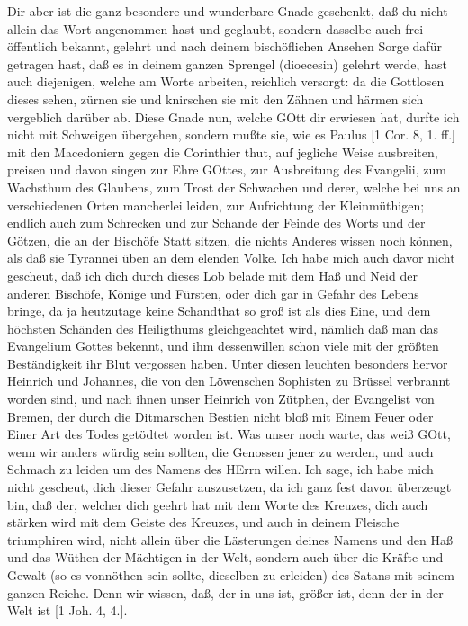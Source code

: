 Dir aber ist die ganz besondere und wunderbare Gnade geschenkt, daß du nicht allein das Wort angenommen hast und geglaubt, sondern dasselbe auch frei öffentlich bekannt, gelehrt und nach deinem bischöflichen Ansehen Sorge dafür getragen hast, daß es in deinem ganzen Sprengel (dioecesin) gelehrt werde, hast auch diejenigen, welche am Worte arbeiten, reichlich versorgt: da die Gottlosen dieses sehen, zürnen sie und knirschen sie mit den Zähnen und härmen sich vergeblich darüber ab. Diese Gnade nun, welche GOtt dir erwiesen hat, durfte ich nicht mit Schweigen übergehen, sondern mußte sie, wie es Paulus [1 Cor. 8, 1. ff.] mit den Macedoniern gegen die Corinthier thut, auf jegliche Weise ausbreiten, preisen und davon singen zur Ehre GOttes, zur Ausbreitung des Evangelii, zum Wachsthum des Glaubens, zum Trost der Schwachen und derer, welche bei uns an verschiedenen Orten mancherlei leiden, zur Aufrichtung der Kleinmüthigen; endlich auch zum Schrecken und zur Schande der Feinde des Worts und der Götzen, die an der Bischöfe Statt sitzen, die nichts Anderes wissen noch können, als daß sie Tyrannei üben an dem elenden Volke. Ich habe mich auch davor nicht gescheut, daß ich dich durch dieses Lob belade mit dem Haß und Neid der anderen Bischöfe, Könige und Fürsten, oder dich gar in Gefahr des Lebens bringe, da ja heutzutage keine Schandthat so groß ist als dies Eine, und dem höchsten Schänden des Heiligthums gleichgeachtet wird, nämlich daß man das Evangelium Gottes bekennt, und ihm dessenwillen schon viele mit der größten Beständigkeit ihr Blut vergossen haben. Unter diesen leuchten besonders hervor Heinrich und Johannes, die von den Löwenschen Sophisten zu Brüssel verbrannt worden sind, und nach ihnen unser Heinrich von Zütphen, der Evangelist von Bremen, der durch die Ditmarschen Bestien nicht bloß mit Einem Feuer oder Einer Art des Todes getödtet worden ist. Was unser noch warte, das weiß GOtt, wenn wir anders würdig sein sollten, die Genossen jener zu werden, und auch Schmach zu leiden um des Namens des HErrn willen. Ich sage, ich habe mich nicht gescheut, dich dieser Gefahr auszusetzen, da ich ganz fest davon überzeugt bin, daß der, welcher dich geehrt hat mit dem Worte des Kreuzes, dich auch stärken wird mit dem Geiste des Kreuzes, und auch in deinem Fleische triumphiren wird, nicht allein über die Lästerungen deines Namens und den Haß und das Wüthen der Mächtigen in der Welt, sondern auch über die Kräfte und Gewalt (so es vonnöthen sein sollte, dieselben zu erleiden) des Satans mit seinem ganzen Reiche. Denn wir wissen, daß, der in uns ist, größer ist, denn der in der Welt ist [1 Joh. 4, 4.].

